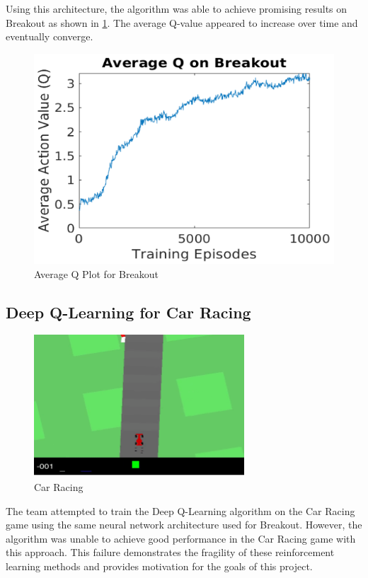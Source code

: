 \documentclass[12pt,letterpaper]{article}
\begin{document}
Using this architecture, the algorithm was able to achieve promising results on Breakout as shown in \ref{fig:breakout}. The average Q-value appeared to increase over time and eventually converge.

\begin{figure}[h!]
\centering\includegraphics[scale=0.5,clip]{breakout_q.png}
\caption{Average Q Plot for Breakout}
\label{fig:breakout}
\end{figure}



\subsection{Deep Q-Learning for Car Racing}

\begin{figure}[h!]
\centering\includegraphics[scale=0.5,clip]{car_racing.png}
\caption{Car Racing}
\label{fig:car_racing}
\end{figure}

The team attempted to train the Deep Q-Learning algorithm on the Car Racing game using the same neural network architecture used for Breakout. However, the algorithm was unable to achieve good performance in the Car Racing game with this approach. This failure demonstrates the fragility of these reinforcement learning methods and provides motivation for the goals of this project.
\end{document}
